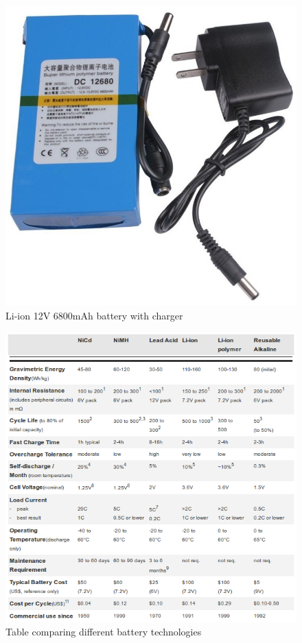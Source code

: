 	\begin{figure}[H]
			\centering
			\includegraphics[scale=0.25]{images/ProjectComponents/battery.jpg}
			\caption{Li-ion 12V 6800mAh battery with charger}
			\label{}
	\end{figure}
	\bigskip

	\begin{figure}[H]
			\centering
			\includegraphics[scale=0.75]{images/ProjectComponents/battery-differences.png}
			\caption{Table comparing different battery technologies}
			\label{}
	\end{figure}
	\bigskip
